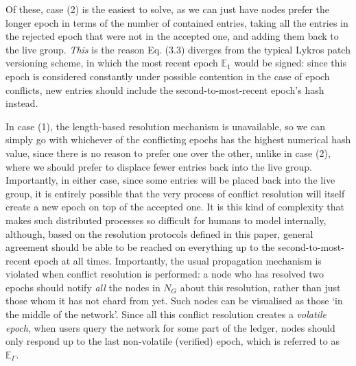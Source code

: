 \documentclass{extreport}
\begin{document}
Of these, case (2) is the easiest to solve, as we can just have nodes prefer the longer epoch in terms of the number of contained entries, taking all the entries in the rejected epoch that were not in the accepted one, and adding them back to the live group. \emph{This} is the reason Eq. (3.3) diverges from the typical Lykros patch versioning scheme, in which the most recent epoch \(\mathbb{E}_1\) would be signed: since this epoch is considered constantly under possible contention in the case of epoch conflicts, new entries should include the second-to-most-recent epoch's hash instead.

In case (1), the length-based resolution mechanism is unavailable, so we can simply go with whichever of the conflicting epochs has the highest numerical hash value, since there is no reason to prefer one over the other, unlike in case (2), where we should prefer to displace fewer entries back into the live group. Importantly, in either case, since some entries will be placed back into the live group, it is entirely possible that the very process of conflict resolution will itself create a new epoch on top of the accepted one. It is this kind of complexity that makes such distributed processes so difficult for humans to model internally, although, based on the resolution protocols defined in this paper, general agreement should be able to be reached on everything up to the second-to-most-recent epoch at all times. Importantly, the usual propagation mechanism is violated when conflict resolution is performed: a node who has resolved two epochs should notify \emph{all} the nodes in \(N_G\) about this resolution, rather than just those whom it has not ehard from yet. Such nodes can be visualised as those `in the middle of the network'. Since all this conflict resolution creates a \emph{volatile epoch}, when users query the network for some part of the ledger, nodes should only respond up to the last non-volatile (verified) epoch, which is referred to as \(\mathbb{E}_\Gamma\).
\end{document}
